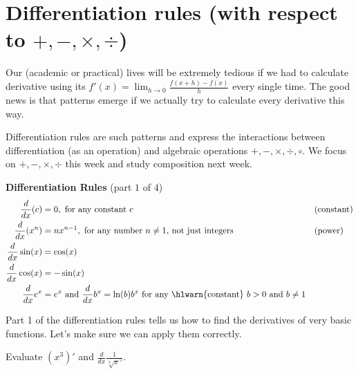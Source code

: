 \documentclass[../main.tex]{subfiles}
\begin{document}
 \section{Differentiation rules (with respect to \texorpdfstring{\(+,-,\times,\div\)}{+, -, •, ÷})}
Our (academic or practical) lives will be extremely tedious if we had to calculate derivative using its \(f'(x) = \lim_{h \to 0} {\textstyle\frac{f(x+h) - f(x)}{h}}\) every single time.  The good news is that patterns emerge if we actually try to calculate every derivative this way. 

Differentiation rules are such patterns and express the interactions between differentiation (as an operation) and algebraic operations \(+, -, \times, \div, \circ\). We focus on \(+, -, \times, \div\) this week and study composition next week.

\begin{mdframed}[style=simple] \label{thm:diff-rules-1}
  \textbf{Differentiation Rules} \hfill {\footnotesize (part \(1\) of \(4\))}
  \begin{align*}
    \frac{d}{dx} (c)
    &= 0, \text{ for any constant \(c\)}
    && \text{(constant)} \\
    \frac{d}{dx} (x^{n})
    &= n x^{n-1}, \text{ for any number \(n \ne 1\), not just integers} 
    && \text{(power)} \\
    \frac{d}{dx} \sin(x)
    &= \cos(x) \\
    \frac{d}{dx} \cos(x)
    &= -\sin(x) \\
    \frac{d}{dx} e^{x} &= e^{x} \text{ and } \frac{d}{dx}b^{x} = \ln(b)b^{x} \text{ for any \hlwarn{constant} } b > 0 \text{ and } b \ne 1
  \end{align*}
\end{mdframed}

Part 1 of the differentiation rules tells us how to find the derivatives of very basic functions. Let's make sure we can apply them correctly.

\begin{example}
  Evaluate \((x^{3})'\) and \(\frac{d}{dx}\frac{1}{\sqrt[3]{x}^{5}}\).

\end{example}

\end{document}
